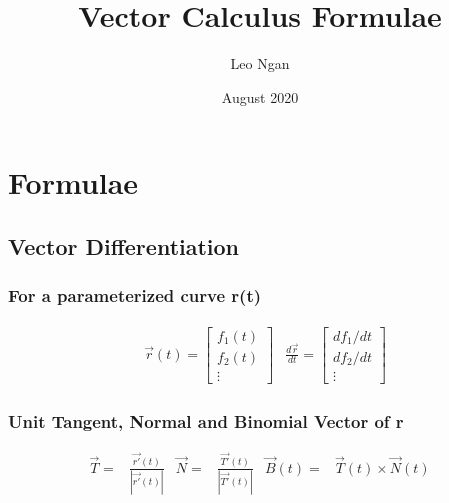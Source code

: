 \documentclass{article}
\title{Vector Calculus Formulae}
\author{Leo Ngan}
\date{August 2020}
\begin{document}
\maketitle\pagebreak

\tableofcontents\pagebreak

\section{Formulae}
    \subsection{Vector Differentiation}
        \subsubsection{For a parameterized curve r(t)}
            \begin{align*}
                &\vec{r}(t) = \left[\begin{array}{c}f_1(t)\\[6pt]f_2(t)\\[6pt]\vdots\end{array}\right]
                & \frac{d\vec{r}}{dt} = \left[\begin{array}{c}df_1/dt\\[6pt]df_2/dt\\[6pt]\vdots\end{array}\right]
            \end{align*}
        \subsubsection{Unit Tangent, Normal and Binomial Vector of r}
            \begin{align*}
                \vec{T} =& \frac{\vec{r'}(t)}{\left| \vec{r'}(t) \right|} &
                \vec{N} =& \frac{\vec{T'}(t)}{\left| \vec{T'}(t) \right|} &
                \vec{B}(t) =& \vec{T}(t)\times\vec{N}(t)
            \end{align*}
\end{document}
